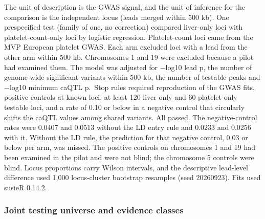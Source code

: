 The unit of description is the GWAS signal, and the unit of inference for the comparison is the independent locus (leads merged within 500 kb). One prespecified test (family of one, no correction) compared liver-only loci with platelet-count-only loci by logistic regression. Platelet-count loci came from the MVP European platelet GWAS. Each arm excluded loci with a lead from the other arm within 500 kb. Chromosomes 1 and 19 were excluded because a pilot had examined them. The model was adjusted for −log10 lead p, the number of genome-wide significant variants within 500 kb, the number of testable peaks and −log10 minimum caQTL p.~Stop rules required reproduction of the GWAS fits, positive controls at known loci, at least 120 liver-only and 60 platelet-only testable loci, and a rate of 0.10 or below in a negative control that circularly shifts the caQTL values among shared variants. All passed. The negative-control rates were 0.0407 and 0.0513 without the LD entry rule and 0.0233 and 0.0256 with it. Without the LD rule, the prediction for that negative control, 0.03 or below per arm, was missed. The positive controls on chromosomes 1 and 19 had been examined in the pilot and were not blind; the chromosome 5 controls were blind. Locus proportions carry Wilson intervals, and the descriptive lead-level difference used 1,000 locus-cluster bootstrap resamples (seed 20260923). Fits used susieR 0.14.2.

\subsubsection{Joint testing universe and evidence classes}\label{joint-testing-universe-and-evidence-classes}

